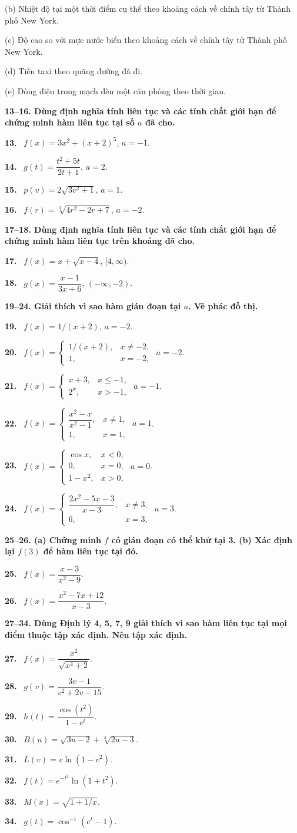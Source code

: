 \documentclass[12pt,a4paper]{article}
\newcommand{\bt}[1]{\par\smallskip\noindent\textbf{#1.}\ }
\newcommand{\group}[1]{\par\medskip\noindent\textbf{#1}\par\nopagebreak[4]}
\begin{document}
(b) Nhiệt độ tại một thời điểm cụ thể theo khoảng cách về chính tây từ Thành phố New York.

(c) Độ cao so với mực nước biển theo khoảng cách về chính tây từ Thành phố New York.

(d) Tiền taxi theo quãng đường đã đi.

(e) Dòng điện trong mạch đèn một căn phòng theo thời gian.
\group{13–16. Dùng định nghĩa tính liên tục và các tính chất giới hạn để chứng minh hàm liên tục tại số $a$ đã cho.}
\bt{13} $f(x)=3x^2+(x+2)^5$, $a=-1$.
\bt{14} $g(t)=\dfrac{t^2+5t}{2t+1}$, $a=2$.
\bt{15} $p(v)=2\sqrt{3v^2+1}$, $a=1$.
\bt{16} $f(r)=\sqrt[3]{4r^2-2r+7}$, $a=-2$.
\group{17–18. Dùng định nghĩa tính liên tục và các tính chất giới hạn để chứng minh hàm liên tục trên khoảng đã cho.}
\bt{17} $f(x)=x+\sqrt{x-4}$, $[4,\infty)$.
\bt{18} $g(x)=\dfrac{x-1}{3x+6}$, $(-\infty,-2)$.
\group{19–24. Giải thích vì sao hàm gián đoạn tại $a$. Vẽ phác đồ thị.}
\bt{19} $f(x)=1/(x+2)$, $a=-2$.
\bt{20} $f(x)=\begin{cases}1/(x+2),&x\ne-2,\\1,&x=-2,\end{cases}$ $a=-2$.
\bt{21} $f(x)=\begin{cases}x+3,&x\le-1,\\2^x,&x>-1,\end{cases}$ $a=-1$.
\bt{22} $f(x)=\begin{cases}\dfrac{x^2-x}{x^2-1},&x\ne1,\\1,&x=1,\end{cases}$ $a=1$.
\bt{23} $f(x)=\begin{cases}\cos x,&x<0,\\0,&x=0,\\1-x^2,&x>0,\end{cases}$ $a=0$.
\bt{24} $f(x)=\begin{cases}\dfrac{2x^2-5x-3}{x-3},&x\ne3,\\6,&x=3,\end{cases}$ $a=3$.
\group{25–26. (a) Chứng minh $f$ có gián đoạn có thể khử tại 3. (b) Xác định lại $f(3)$ để hàm liên tục tại đó.}
\bt{25} $f(x)=\dfrac{x-3}{x^2-9}$.
\bt{26} $f(x)=\dfrac{x^2-7x+12}{x-3}$.
\group{27–34. Dùng Định lý 4, 5, 7, 9 giải thích vì sao hàm liên tục tại mọi điểm thuộc tập xác định. Nêu tập xác định.}
\bt{27} $f(x)=\dfrac{x^2}{\sqrt{x^4+2}}$.
\bt{28} $g(v)=\dfrac{3v-1}{v^2+2v-15}$.
\bt{29} $h(t)=\dfrac{\cos(t^2)}{1-e^t}$.
\bt{30} $B(u)=\sqrt{3u-2}+\sqrt[3]{2u-3}$.
\bt{31} $L(v)=v\ln(1-v^2)$.
\bt{32} $f(t)=e^{-t^2}\ln(1+t^2)$.
\bt{33} $M(x)=\sqrt{1+1/x}$.
\bt{34} $g(t)=\cos^{-1}(e^t-1)$.
\end{document}
